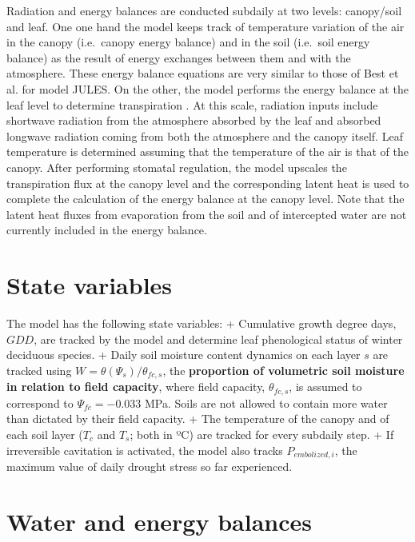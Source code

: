 \documentclass[]{book}
\begin{document}
Radiation and energy balances are conducted subdaily at two levels: canopy/soil and leaf. One one hand the model keeps track of temperature variation of the air in the canopy (i.e.~canopy energy balance) and in the soil (i.e.~soil energy balance) as the result of energy exchanges between them and with the atmosphere. These energy balance equations are very similar to those of Best et al. \citeyearpar{Best2011} for model JULES. On the other, the model performs the energy balance at the leaf level to determine transpiration \citep{Sperry2016}. At this scale, radiation inputs include shortwave radiation from the atmosphere absorbed by the leaf and absorbed longwave radiation coming from both the atmosphere and the canopy itself. Leaf temperature is determined assuming that the temperature of the air is that of the canopy. After performing stomatal regulation, the model upscales the transpiration flux at the canopy level and the corresponding latent heat is used to complete the calculation of the energy balance at the canopy level. Note that the latent heat fluxes from evaporation from the soil and of intercepted water are not currently included in the energy balance.

\hypertarget{state-variables-1}{%
\section{State variables}\label{state-variables-1}}

The model has the following state variables:
+ Cumulative growth degree days, \(GDD\), are tracked by the model and determine leaf phenological status of winter deciduous species.
+ Daily soil moisture content dynamics on each layer \(s\) are tracked using \(W = \theta(\Psi_s)/ \theta_{fc,s}\), the \textbf{proportion of volumetric soil moisture in relation to field capacity}, where field capacity, \(\theta_{fc,s}\), is assumed to correspond to \(\Psi_{fc} = -0.033\) MPa. Soils are not allowed to contain more water than dictated by their field capacity.
+ The temperature of the canopy and of each soil layer (\(T_c\) and \(T_s\); both in ºC) are tracked for every subdaily step.
+ If irreversible cavitation is activated, the model also tracks \(P_{embolized,i}\), the maximum value of daily drought stress so far experienced.

\hypertarget{water-and-energy-balances}{%
\section{Water and energy balances}\label{water-and-energy-balances}}
\end{document}
